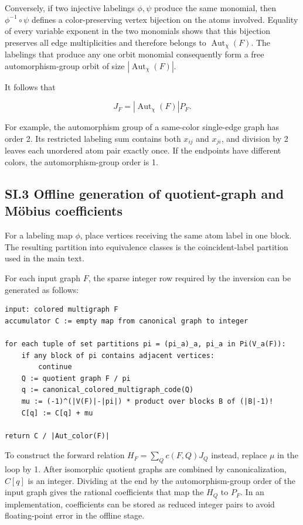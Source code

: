 Conversely, if two injective labelings \(\phi,\psi\) produce the same monomial, then \(\phi^{-1}\circ\psi\) defines a color-preserving vertex bijection on the atoms involved. Equality of every variable exponent in the two monomials shows that this bijection preserves all edge multiplicities and therefore belongs to \(\operatorname{Aut}_\chi(F)\). The labelings that produce any one orbit monomial consequently form a free automorphism-group orbit of size \(|\operatorname{Aut}_\chi(F)|\).

It follows that

\[
J_F=|\operatorname{Aut}_\chi(F)|P_F.
\]

For example, the automorphism group of a same-color single-edge graph has order 2. Its restricted labeling sum contains both \(x_{ij}\) and \(x_{ji}\), and division by 2 leaves each unordered atom pair exactly once. If the endpoints have different colors, the automorphism-group order is 1.

\subsection{SI.3 Offline generation of quotient-graph and M\"obius coefficients}\label{sec:si-mobius}

For a labeling map \(\phi\), place vertices receiving the same atom label in one block. The resulting partition into equivalence classes is the coincident-label partition used in the main text.

For each input graph \(F\), the sparse integer row required by the inversion can be generated as follows:

\begin{verbatim}
input: colored multigraph F
accumulator C := empty map from canonical graph to integer

for each tuple of set partitions pi = (pi_a)_a, pi_a in Pi(V_a(F)):
    if any block of pi contains adjacent vertices:
        continue
    Q := quotient graph F / pi
    q := canonical_colored_multigraph_code(Q)
    mu := (-1)^(|V(F)|-|pi|) * product over blocks B of (|B|-1)!
    C[q] := C[q] + mu

return C / |Aut_color(F)|
\end{verbatim}

To construct the forward relation \(H_F=\sum_Qc(F,Q)J_Q\) instead, replace \(\mu\) in the loop by 1. After isomorphic quotient graphs are combined by canonicalization, \(C[q]\) is an integer. Dividing at the end by the automorphism-group order of the input graph gives the rational coefficients that map the \(H_Q\) to \(P_F\). In an implementation, coefficients can be stored as reduced integer pairs to avoid floating-point error in the offline stage.

